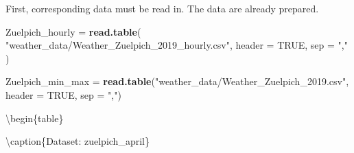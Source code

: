 \documentclass[
]{book}
\newenvironment{Shaded}{\begin{snugshade}}{\end{snugshade}}
\newcommand{\DataTypeTok}[1]{\textcolor[rgb]{0.13,0.29,0.53}{#1}}
\newcommand{\DecValTok}[1]{\textcolor[rgb]{0.00,0.00,0.81}{#1}}
\newcommand{\KeywordTok}[1]{\textcolor[rgb]{0.13,0.29,0.53}{\textbf{#1}}}
\newcommand{\NormalTok}[1]{#1}
\newcommand{\OperatorTok}[1]{\textcolor[rgb]{0.81,0.36,0.00}{\textbf{#1}}}
\newcommand{\OtherTok}[1]{\textcolor[rgb]{0.56,0.35,0.01}{#1}}
\newcommand{\StringTok}[1]{\textcolor[rgb]{0.31,0.60,0.02}{#1}}
\begin{document}
First, corresponding data must be read in. The data are already prepared.

\begin{Shaded}
\begin{Highlighting}[]
\NormalTok{Zuelpich_hourly =}\StringTok{ }\KeywordTok{read.table}\NormalTok{(}
  \StringTok{"weather_data/Weather_Zuelpich_2019_hourly.csv"}\NormalTok{,}
  \DataTypeTok{header =} \OtherTok{TRUE}\NormalTok{,}
  \DataTypeTok{sep =} \StringTok{","}
\NormalTok{)}

\NormalTok{Zuelpich_min_max =}\StringTok{ }\KeywordTok{read.table}\NormalTok{(}\StringTok{"weather_data/Weather_Zuelpich_2019.csv"}\NormalTok{,}
                              \DataTypeTok{header =} \OtherTok{TRUE}\NormalTok{,}
                              \DataTypeTok{sep =} \StringTok{","}\NormalTok{)}
\end{Highlighting}
\end{Shaded}

\begin{Shaded}
\end{Shaded}

\textbackslash begin\{table\}

\textbackslash caption\{\label{tab:unnamed-chunk-20}Dataset: zuelpich\_april\}
\fontsize{10}{12}\selectfont
\end{document}

